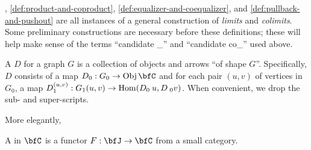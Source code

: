 \documentclass[a5paper]{article}
\begin{document}
, \cref{def:product-and-coproduct},
\cref{def:equalizer-and-coequalizer}, and \cref{def:pullback-and-pushout}
are all instances of a general construction of \textit{limits} and
\textit{colimits}. Some preliminary constructions are necessary before these
definitions; these will help make sense of the terms ``candidate \_'' and
``candidate co\_'' used above.


\begin{definition}
  A  $D$ for a graph $G$ is a collection
  of objects and arrows ``of shape $G$''. Specifically, $D$ consists of a map
  $D_0:G_0\to \Obj\bfC$ and for each pair $(u,v)$ of vertices in $G_0$,
  a map $D_{1}^{(u,v)}:G_1(u,v)\to \operatorname{Hom}(D_0\hspace{0.23em} u,D\hspace{0.23em} _0{v})$.
  When convenient, we drop the sub- and super-scripts.
\end{definition}

More elegantly,

\begin{definition}
  A  in $\bfC$ is a functor $F:\bfJ\to\bfC$ from
  a small category.
\end{definition}
\end{document}
